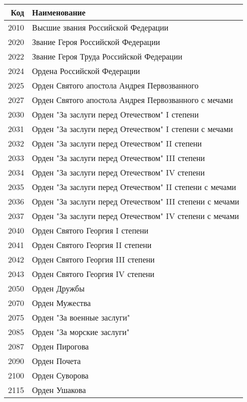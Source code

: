 \documentclass[10pt, a4paper, titlepage]{article}
\begin{document}
\begin{center}
    \begin{longtable}{rp{}}
        \hline
        \textbf{Код} & \textbf{Наименование} \\ \hline
        2010 & Высшие звания Российской Федерации \\
        2020 & Звание Героя Российской Федерации \\
        2022 & Звание Героя Труда Российской Федерации \\
        2024 & Ордена Российской Федерации \\
        2025 & Орден Святого апостола Андрея Первозванного \\
        2027 & Орден Святого апостола Андрея Первозванного с мечами \\
        2030 & Орден "За заслуги перед Отечеством" I степени \\
        2031 & Орден "За заслуги перед Отечеством" I степени с мечами \\
        2032 & Орден "За заслуги перед Отечеством" II степени \\
        2033 & Орден "За заслуги перед Отечеством" III степени \\
        2034 & Орден "За заслуги перед Отечеством" IV степени \\
        2035 & Орден "За заслуги перед Отечеством" II степени с мечами \\
        2036 & Орден "За заслуги перед Отечеством" III степени с мечами \\
        2037 & Орден "За заслуги перед Отечеством" IV степени с мечами \\
        2040 & Орден Святого Георгия I степени \\
        2041 & Орден Святого Георгия II степени \\
        2042 & Орден Святого Георгия III степени \\
        2043 & Орден Святого Георгия IV степени \\
        2050 & Орден Дружбы \\
        2070 & Орден Мужества \\
        2075 & Орден "За военные заслуги" \\
        2085 & Орден "За морские заслуги" \\
        2087 & Орден Пирогова \\
        2090 & Орден Почета \\
        2100 & Орден Суворова \\
        2115 & Орден Ушакова \\

\end{longtable}
\end{center}
\end{document}
